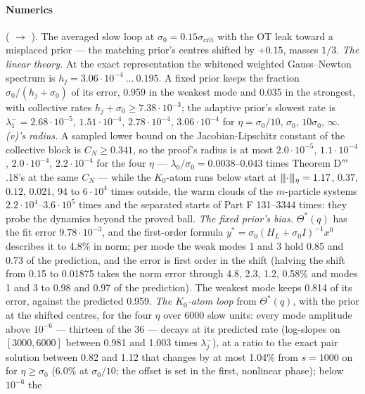 \paragraph{Numerics} ( $\to$ ). The averaged slow
loop at $\sigma_0 = 0.15\sigma_{\mathrm{crit}}$ with the OT leak toward a misplaced prior --- the matching prior's
centres shifted by $+0.15$, masses $1/3$. \emph{The linear theory.} At the exact representation the whitened weighted
Gauss--Newton spectrum is $h_j = 3.06\cdot10^{-4}\ \dots\ 0.195$. A fixed prior keeps the fraction
$\sigma_0/(h_j + \sigma_0)$ of its error, 0.959 in the weakest mode and 0.035 in the strongest, with collective rates
$h_j + \sigma_0\ge7.38\cdot10^{-3}$; the adaptive prior's slowest rate is $\lambda_1^- = 2.68\cdot10^{-5}$,
$1.51\cdot10^{-4}$, $2.78\cdot10^{-4}$, $3.06\cdot10^{-4}$ for $\eta = \sigma_0/10$, $\sigma_0$, $10\sigma_0$,
$\infty$. \emph{(v)'s radius.} A sampled lower bound on the Jacobian-Lipschitz constant of the collective block is
$C_N\ge0.341$, so the proof's radius is at most $2.0\cdot10^{-5}$, $1.1\cdot10^{-4}$, $2.0\cdot10^{-4}$,
$2.2\cdot10^{-4}$ for the four $\eta$ --- $\lambda_0/\sigma_0 = 0.0038$--$0.043$ times Theorem D$'''$.18's at the same
$C_N$ --- while the $K_0$-atom runs below start at $\lvert\kern-0.25ex\lvert\kern-0.25ex\lvert \cdot\rvert\kern-0.25ex\rvert\kern-0.25ex\rvert_\eta = 1.17$, $0.37$, $0.12$, $0.021$, 94 to
$6\cdot10^4$ times outside, the warm clouds of the $m$-particle systems $2.2\cdot10^4$--$3.6\cdot10^5$ times and the
separated starts of Part F 131--3344 times: they probe the dynamics beyond the proved ball. \emph{The fixed prior's
bias.} $\Theta^*(q)$ has the fit error $9.78\cdot10^{-3}$, and the first-order formula
$y^* = \sigma_0(H_L + \sigma_0I)^{-1}x^0$ describes it to 4.8\% in norm; per mode the weak modes 1 and 3 hold 0.85 and
0.73 of the prediction, and the error is first order in the shift (halving the shift from 0.15 to 0.01875 takes the
norm error through 4.8, 2.3, 1.2, 0.58\% and modes 1 and 3 to 0.98 and 0.97 of the prediction). The weakest mode keeps
0.814 of its error, against the predicted 0.959. \emph{The $K_0$-atom loop} from $\Theta^*(q)$, with the prior at the
shifted centres, for the four $\eta$ over 6000 slow units: every mode amplitude above $10^{-6}$ --- thirteen of the 36
--- decays at its predicted rate (log-slopes on $[3000,6000]$ between 0.981 and 1.003 times $\lambda_j^-$), at a ratio
to the exact pair solution between 0.82 and 1.12 that changes by at most 1.04\% from $s = 1000$ on for
$\eta\ge\sigma_0$ (6.0\% at $\sigma_0/10$; the offset is set in the first, nonlinear phase); below $10^{-6}$ the

